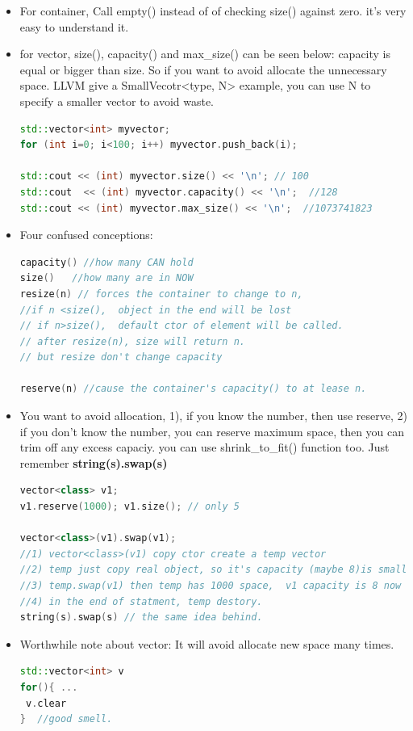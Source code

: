 \documentclass[a4paper,11pt,twoside]{book}
\begin{document}
\begin{itemize}
\item For container, Call empty() instead of of checking size() against zero. it's very easy to understand it.

\item for vector, size(), capacity() and max\_size() can be seen below: capacity is equal or bigger than size. So if you want to avoid allocate the unnecessary space.  LLVM give a SmallVecotr<type, N> example, you can use N to specify a smaller vector to avoid waste.
\begin{lstlisting}[frame=single, language=c++]
std::vector<int> myvector;
for (int i=0; i<100; i++) myvector.push_back(i);

std::cout << (int) myvector.size() << '\n'; // 100
std::cout  << (int) myvector.capacity() << '\n';  //128
std::cout << (int) myvector.max_size() << '\n';  //1073741823
\end{lstlisting}


\item Four confused conceptions:
\begin{lstlisting}[frame=single, language=c++]
capacity() //how many CAN hold
size()   //how many are in NOW
resize(n) // forces the container to change to n,
//if n <size(),  object in the end will be lost
// if n>size(),  default ctor of element will be called.
// after resize(n), size will return n.
// but resize don't change capacity

reserve(n) //cause the container's capacity() to at lease n.
\end{lstlisting}

\item You want to avoid allocation, 1), if you know the number, then use reserve, 2) if you don't know the number, you can reserve maximum space, then you can trim off any excess capaciy.  you can use shrink\_to\_fit() function too. Just remember \textbf{string(s).swap(s)}
\begin{lstlisting}[frame=single, language=c++]
vector<class> v1;
v1.reserve(1000); v1.size(); // only 5

vector<class>(v1).swap(v1);
//1) vector<class>(v1) copy ctor create a temp vector
//2) temp just copy real object, so it's capacity (maybe 8)is small.
//3) temp.swap(v1) then temp has 1000 space,  v1 capacity is 8 now
//4) in the end of statment, temp destory.
string(s).swap(s) // the same idea behind.
\end{lstlisting}

\item Worthwhile note about vector: It will avoid allocate new space many times.
\begin{lstlisting}[frame=single, language=c++]
std::vector<int> v
for(){ ...
 v.clear
}  //good smell.


\end{lstlisting}
\end{itemize}
\end{document}
